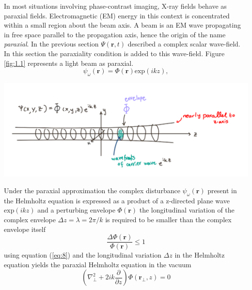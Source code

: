 \documentclass[10pt, a4paper, singlespacing]{report}
\newenvironment{Figure}
    {\par\medskip\noindent\minipage{\linewidth}}
    {\endminipage\par\medskip}
\begin{document}
In most situations involving phase-contrast imaging, X-ray fields behave as paraxial fields. Electromagnetic (EM) energy in this context is concentrated within a small region about the beam axis. A beam is an EM wave propagating in free space parallel to the propagation axis, hence the origin of the name \textit{paraxial}.
In the previous section $\Psi(\mathbf{r},t)$ described a complex scalar wave-field. In this section the paraxiality condition is added to this wave-field. Figure \ref{fig:1.1} represents a light beam as paraxial.
\begin{equation}\label{eq:7}
\psi_{\omega}(\mathbf{r}) = \Phi(\mathbf{r})\mathrm{exp}(ikz),
\end{equation}
\begin{Figure}
\centering
\includegraphics[width=0.6\linewidth]{paraxial_beam.pdf}
\label{fig:1.1}
\end{Figure}
Under the paraxial approximation the complex disturbance $\psi_{\omega}(\mathbf{r})$ present in the Helmholtz equation is expressed as a product of a z-directed plane wave $\mathrm{exp}(ikz)$ and a perturbing envelope $\Phi(\mathbf{r})$\cite{PagsTutes}\cite{CH49}
the longitudinal variation of the complex envelope $\Delta z = \lambda = 2 \pi/k$ is required to be smaller than the complex envelope itself
\begin{equation}\label{eq:8}
\frac{\Delta \Phi(\mathbf{r})}{\Phi(\mathbf{r})} \leq 1
\end{equation}
using equation (\ref{eq:8}) and the longitudinal variation $\Delta z$  in the Helmholtz equation yields the paraxial Helmholtz equation in the vacuum
\begin{equation}\label{eq:9}
\left (\nabla_{\perp}^{2} + 2 i k \frac{\partial }{\partial z}\right ) \Phi(\mathbf{r}_{\perp}, z) = 0
\end{equation}

\end{document}
